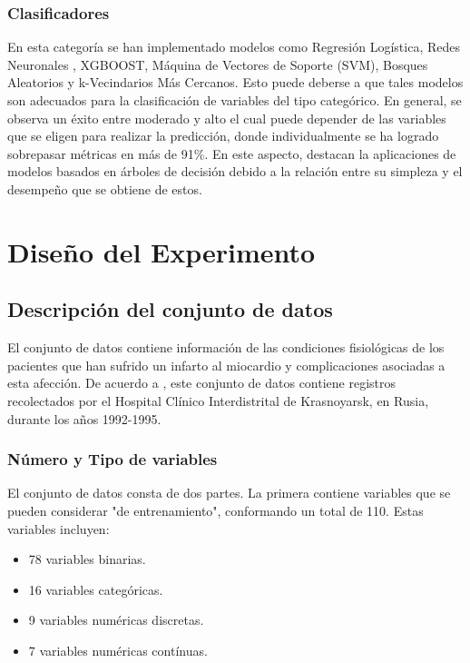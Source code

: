 \documentclass[conference]{IEEEtran}
\begin{document}
\subsubsection{\textbf{Clasificadores}}
 En esta categoría se han implementado modelos como Regresión Logística\cite{bx}\cite{bz}, Redes Neuronales \cite{bx}\cite{bz}\cite{ll}\cite{bp}, XGBOOST\cite{bz}\cite{bp}, Máquina de Vectores de Soporte (SVM)\cite{bz}, Bosques Aleatorios\cite{bz} y k-Vecindarios Más Cercanos\cite{b?}\cite{by}. Esto puede deberse a que tales modelos son adecuados para la clasificación de variables del tipo categórico. En general, se observa un éxito entre moderado y alto el cual puede depender de las variables que se eligen para realizar la predicción, donde individualmente se ha logrado sobrepasar métricas en más de 91\%. En este aspecto, destacan la aplicaciones de modelos basados en árboles de decisión debido a la relación entre su simpleza y el desempeño que se obtiene de estos.

\section{\textbf{Diseño del Experimento}}
\subsection{\textbf{Descripción del conjunto de datos}}\label{EDA}
El conjunto de datos contiene información de las condiciones fisiológicas de los pacientes que han sufrido un infarto al miocardio y complicaciones asociadas a esta afección. De acuerdo a \cite{b1}, este conjunto de datos contiene registros recolectados por el Hospital Clínico Interdistrital de Krasnoyarsk, en Rusia, durante los años 1992-1995. 
\subsubsection{Número y Tipo de variables}\label{nvar}
El conjunto de datos consta de dos partes. La primera contiene variables que se pueden considerar "de entrenamiento", conformando un total de 110. Estas variables incluyen:
\begin{itemize}
    \item 78 variables binarias.
    \item 16 variables categóricas.
    \item 9 variables numéricas discretas.
    \item 7 variables numéricas contínuas.
\end{itemize}
\end{document}
